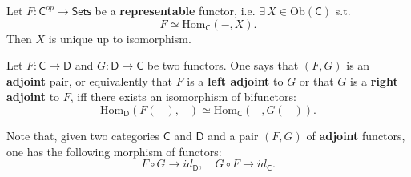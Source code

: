 \begin{prop}
	Let $F: \mathsf{C}^{op} \to \mathsf{Sets}$ be a \textbf{representable} functor, i.e. $\exists\, X \in \mathrm{Ob} \left(\mathsf{C}\right)$ s.t.
	\begin{equation}
	F \simeq \mathrm{Hom}_{\mathsf{C}} \left( -, X \right)
	.\end{equation} 
	Then $X$ is unique up to isomorphism.
\end{prop} 

\begin{defn}
	Let $F: \mathsf{C} \to \mathsf{D}$ and $G: \mathsf{D} \to \mathsf{C}$ be two functors.
	One says that $\left(F, G\right)$ is an \textbf{adjoint} pair, or equivalently that $F$ is a \textbf{left adjoint} to $G$ or that $G$ is a \textbf{right adjoint} to $F$,
	iff there exists an isomorphism of bifunctors:
	\begin{equation}
		\mathrm{Hom}_{\mathsf{D}} \left( F(-), - \right) \simeq
		\mathrm{Hom}_{\mathsf{C}} \left( -, G(-) \right)
	.\end{equation} 
\end{defn}

\begin{rem}
	Note that, given two categories $\mathsf{C}$ and $\mathsf{D}$ and a pair $\left(F, G\right)$ of \textbf{adjoint} functors, one has the following morphism of functors:
	\begin{equation}
	F \circ G \to id_\mathsf{D}, \quad G \circ F \to id_\mathsf{C}
	.\end{equation} 
\end{rem}
